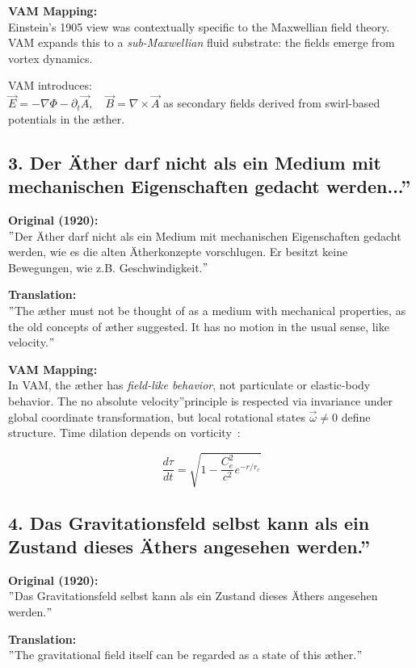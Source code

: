 \textbf{VAM Mapping:} \\
Einstein's 1905 view was contextually specific to the Maxwellian field theory. VAM expands this to a \emph{sub-Maxwellian} fluid substrate: the fields emerge from vortex dynamics.

VAM introduces: \\
\( \vec{E} = -\nabla \Phi - \partial_t \vec{A}, \quad \vec{B} = \nabla \times \vec{A} \) as secondary fields derived from swirl-based potentials in the æther.

\subsection*{3. \grqq Der Äther darf nicht als ein Medium mit mechanischen Eigenschaften gedacht werden...\textquotedblright}
\textbf{Original (1920):} \\
\("\)Der Äther darf nicht als ein Medium mit mechanischen Eigenschaften gedacht werden, wie es die alten Ätherkonzepte vorschlugen. Er besitzt keine Bewegungen, wie z.B. Geschwindigkeit.\("\)

\textbf{Translation:} \\
\("\)The æther must not be thought of as a medium with mechanical properties, as the old concepts of æther suggested. It has no motion in the usual sense, like velocity.\("\)

\textbf{VAM Mapping:} \\
In VAM, the æther has \emph{field-like behavior}, not particulate or elastic-body behavior. The \grqq no absolute velocity\textquotedblright principle is respected via invariance under global coordinate transformation, but local rotational states \( \vec{\omega} \neq 0 \) define structure. Time dilation depends on vorticity~\cite{VAM-2}:

\[
\frac{d\tau}{dt} = \sqrt{1 - \frac{C_e^2}{c^2} e^{-r/r_c}}
\]

\subsection*{4. \grqq Das Gravitationsfeld selbst kann als ein Zustand dieses Äthers angesehen werden.\textquotedblright}
\textbf{Original (1920):} \\
\("\)Das Gravitationsfeld selbst kann als ein Zustand dieses Äthers angesehen werden.\("\)

\textbf{Translation:} \\
\("\)The gravitational field itself can be regarded as a state of this æther.\("\)

